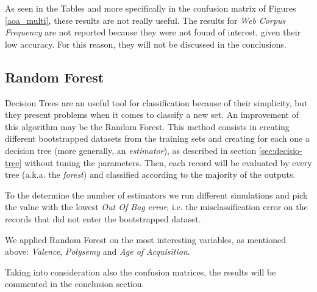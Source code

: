 \documentclass[a4paper,11pt,dvipsnames]{article}
\begin{document}
As seen in the Tables and more specifically in the confusion matrix of Figures \ref{aoa_multi}, these results are not really useful. The results for \textit{Web Corpus Frequency} are not reported because they were not found of interest, given their low accuracy. For this reason, they will not be discussed in the conclusions.


\subsection{Random Forest}

Decision Trees are an useful tool for classification because of their simplicity, but they present problems when it comes to classify a new set. An improvement of this algorithm may be the Random Forest. This method consists in creating different bootstrapped datasets from the training sets and creating for each one a decision tree (more generally, an \textit{estimator}), as described in section \ref{sec:decisio-tree} without tuning the parameters. Then, each record will be evaluated by every tree (a.k.a. the \textit{forest}) and classified according to the majority of the outputs.

To the determine the number of estimators we run different simulations and pick the value with the lowest \textit{Out Of Bag error}, i.e. the misclassification error on the records that did not enter the bootstrapped dataset.

We applied Random Forest on the most interesting variables, as mentioned above: \textit{Valence}, \textit{Polysemy} and \textit{Age of Acquisition}. 

Taking into consideration also the confusion matrices, the results will be commented in the conclusion section.
\end{document}
